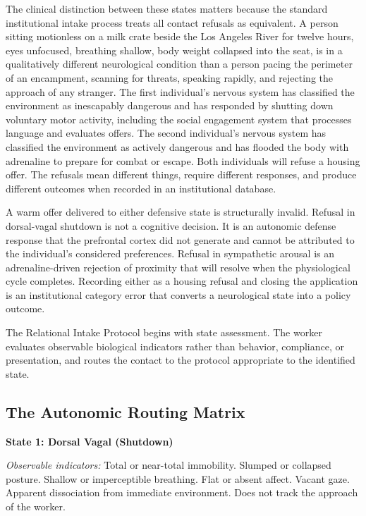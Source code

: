 \documentclass[12pt, letterpaper]{article}
\begin{document}
The clinical distinction between these states matters because the standard institutional intake process treats all contact refusals as equivalent. A person sitting motionless on a milk crate beside the Los Angeles River for twelve hours, eyes unfocused, breathing shallow, body weight collapsed into the seat, is in a qualitatively different neurological condition than a person pacing the perimeter of an encampment, scanning for threats, speaking rapidly, and rejecting the approach of any stranger. The first individual's nervous system has classified the environment as inescapably dangerous and has responded by shutting down voluntary motor activity, including the social engagement system that processes language and evaluates offers. The second individual's nervous system has classified the environment as actively dangerous and has flooded the body with adrenaline to prepare for combat or escape. Both individuals will refuse a housing offer. The refusals mean different things, require different responses, and produce different outcomes when recorded in an institutional database.

A warm offer delivered to either defensive state is structurally invalid. Refusal in dorsal-vagal shutdown is not a cognitive decision. It is an autonomic defense response that the prefrontal cortex did not generate and cannot be attributed to the individual's considered preferences. Refusal in sympathetic arousal is an adrenaline-driven rejection of proximity that will resolve when the physiological cycle completes. Recording either as a housing refusal and closing the application is an institutional category error that converts a neurological state into a policy outcome.

The Relational Intake Protocol begins with state assessment. The worker evaluates observable biological indicators rather than behavior, compliance, or presentation, and routes the contact to the protocol appropriate to the identified state.

\subsection{The Autonomic Routing Matrix}

\textbf{State 1: Dorsal Vagal (Shutdown)}

\textit{Observable indicators:} Total or near-total immobility. Slumped or collapsed posture. Shallow or imperceptible breathing. Flat or absent affect. Vacant gaze. Apparent dissociation from immediate environment. Does not track the approach of the worker.
\end{document}

